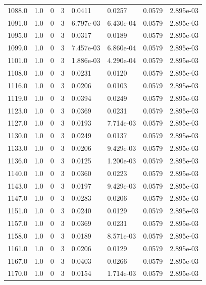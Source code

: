 \documentclass[preview]{standalone}
\begin{document}
{{{{{{{{\begin{tabular}{L{1.2cm}C{1.2cm} C{0.3cm}C{0.5cm} C{1.4cm}C{1.4cm} C{1.4cm}C{1.4cm}}
  1088.0  &   1.0  & 0     &  3 &  0.0411  & 0.0257  & 0.0579 &  2.895e-03   \\ 
  1091.0  &   1.0  & 0     &  3 &  6.797e-03  & 6.430e-04  & 0.0579 &  2.895e-03   \\ 
  1095.0  &   1.0  & 0     &  3 &  0.0317  & 0.0189  & 0.0579 &  2.895e-03   \\ 
  1099.0  &   1.0  & 0     &  3 &  7.457e-03  & 6.860e-04  & 0.0579 &  2.895e-03   \\ 
  1101.0  &   1.0  & 0     &  3 &  1.886e-03  & 4.290e-04  & 0.0579 &  2.895e-03   \\ 
  1108.0  &   1.0  & 0     &  3 &  0.0231  & 0.0120  & 0.0579 &  2.895e-03   \\ 
  1116.0  &   1.0  & 0     &  3 &  0.0206  & 0.0103  & 0.0579 &  2.895e-03   \\ 
  1119.0  &   1.0  & 0     &  3 &  0.0394  & 0.0249  & 0.0579 &  2.895e-03   \\ 
  1123.0  &   1.0  & 0     &  3 &  0.0369  & 0.0231  & 0.0579 &  2.895e-03   \\ 
  1127.0  &   1.0  & 0     &  3 &  0.0193  & 7.714e-03  & 0.0579 &  2.895e-03   \\ 
  1130.0  &   1.0  & 0     &  3 &  0.0249  & 0.0137  & 0.0579 &  2.895e-03   \\ 
  1133.0  &   1.0  & 0     &  3 &  0.0206  & 9.429e-03  & 0.0579 &  2.895e-03   \\ 
  1136.0  &   1.0  & 0     &  3 &  0.0125  & 1.200e-03  & 0.0579 &  2.895e-03   \\ 
  1140.0  &   1.0  & 0     &  3 &  0.0360  & 0.0223  & 0.0579 &  2.895e-03   \\ 
  1143.0  &   1.0  & 0     &  3 &  0.0197  & 9.429e-03  & 0.0579 &  2.895e-03   \\ 
  1147.0  &   1.0  & 0     &  3 &  0.0283  & 0.0206  & 0.0579 &  2.895e-03   \\ 
  1151.0  &   1.0  & 0     &  3 &  0.0240  & 0.0129  & 0.0579 &  2.895e-03   \\ 
  1157.0  &   1.0  & 0     &  3 &  0.0369  & 0.0231  & 0.0579 &  2.895e-03   \\ 
  1158.0  &   1.0  & 0     &  3 &  0.0189  & 8.571e-03  & 0.0579 &  2.895e-03   \\ 
  1161.0  &   1.0  & 0     &  3 &  0.0206  & 0.0129  & 0.0579 &  2.895e-03   \\ 
  1167.0  &   1.0  & 0     &  3 &  0.0403  & 0.0266  & 0.0579 &  2.895e-03   \\ 
  1170.0  &   1.0  & 0     &  3 &  0.0154  & 1.714e-03  & 0.0579 &  2.895e-03   \\ 

\end{tabular}}}}}}}}}
\end{document}
